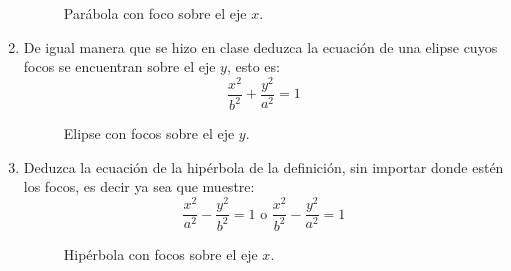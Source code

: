 \documentclass[letterpaper]{article}
\renewcommand{\*}{\cdot}
\theoremstyle{definition}
\begin{document}
\begin{enumerate}
	\begin{figure}[h!]
		\centering
		\caption{Parábola con foco sobre el eje $x$.}
		\label{F1}
	\end{figure}
	
	\newpage
	\item De igual manera que se hizo en clase deduzca la ecuación de una elipse cuyos focos se encuentran sobre el eje $y$, esto es: $$\dfrac{x^2}{b^2} + \dfrac{y^2}{a^2}=1$$
	
	\begin{figure}[h!]
		\centering
		\caption{Elipse con focos sobre el eje $y$.}
		\label{F1}
	\end{figure}
	
	
	
	\item Deduzca la ecuación de la hipérbola de la definición, sin importar donde estén los focos, es decir ya sea que muestre: $$\dfrac{x^2}{a^2} -  \dfrac{y^2}{b^2} = 1 \text{ o }  \dfrac{x^2}{b^2} - \dfrac{y^2}{a^2}=1$$
	
	\begin{figure}[h!]
		\centering
		\caption{Hipérbola con focos sobre el eje $x$.}
		\label{F1}
	\end{figure}
	
	
	
	
\end{enumerate}
\end{document}
